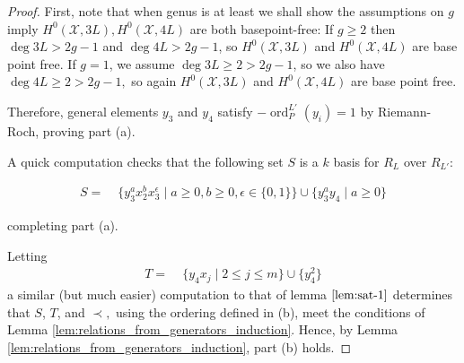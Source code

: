 \documentclass{amsart}
\theoremstyle{plain}
\theoremstyle{definition}
\theoremstyle{remark}
\numberwithin{equation}{section}
\DeclareMathOperator{\ord}{ord}
\newcommand\sx{\mathscr X}
\newcommand{\halfcan}{L}
\DeclareMathOperator{\initial}{in_\prec}
\begin{document}
\begin{proof}
First, note that when genus is at least we shall show the assumptions on $g$ imply $H^0(\sx, 3 \halfcan), H^0(\sx, 4 \halfcan)$ are both basepoint-free: If $g \geq 2$ then $\deg 3 \halfcan > 2g - 1$ 
and $\deg 4 \halfcan > 2g - 1$, so $H^0(\sx, 3 \halfcan)$ and $H^0(\sx, 4 \halfcan)$ are base point free. If $g = 1$, we assume $\deg 3 \halfcan \geq 2 > 2g - 1$, so we also have $\deg 4 \halfcan \geq 2 > 2g - 1,$ so again $H^0(\sx, 3 \halfcan)$ and $H^0(\sx, 4 \halfcan)$ are base point free. 

Therefore, general elements $y_3$ and $y_4$ satisfy $-\ord_P^{\halfcan'}(y_i) = 1$ by Riemann-Roch, proving part (a).

A quick computation checks that
the following set $S$ is a $k$ basis for $R_\halfcan$ over $R_{\halfcan'}$:

\begin{align}
\label{eqn:sat_two_add_generator}
	S =	& \; \{ y_3^ax_2^b x_3^\epsilon \mid a \geq 0, b 
		\geq 0, \epsilon \in \{0, 1\}\} \cup \{ y_3^ay_4 \mid a \geq 0 \}
\end{align}

\noindent
completing part (a).

Letting
\begin{align*}
	T =   &\; \{ y_4 x_j \mid 2 \leq j \leq m \}\cup \{ y_4^2 \}
\end{align*}
a similar (but much easier) computation to that of lemma $\ref{lem:sat-1}$ determines that $S$, $T$, and $\prec,$ using the ordering defined in (b), meet the conditions of 
Lemma \ref{lem:relations_from_generators_induction}. 
Hence, by Lemma \ref{lem:relations_from_generators_induction}, part (b) holds.



\end{proof}
\end{document}
